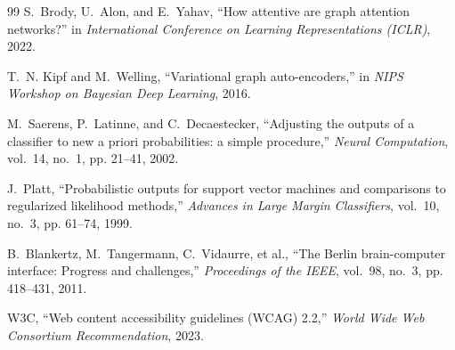 \documentclass[12pt,a4paper]{report}
\begin{document}
\begin{thebibliography}{99}
S.~Brody, U.~Alon, and E.~Yahav, ``How attentive are graph attention networks?'' in \emph{International Conference on Learning Representations (ICLR)}, 2022.

T.~N. Kipf and M.~Welling, ``Variational graph auto-encoders,'' in \emph{NIPS Workshop on Bayesian Deep Learning}, 2016.

M.~Saerens, P.~Latinne, and C.~Decaestecker, ``Adjusting the outputs of a classifier to new a priori probabilities: a simple procedure,'' \emph{Neural Computation}, vol.~14, no.~1, pp. 21--41, 2002.

J.~Platt, ``Probabilistic outputs for support vector machines and comparisons to regularized likelihood methods,'' \emph{Advances in Large Margin Classifiers}, vol.~10, no.~3, pp. 61--74, 1999.

B.~Blankertz, M.~Tangermann, C.~Vidaurre, et al., ``The Berlin brain-computer interface: Progress and challenges,'' \emph{Proceedings of the IEEE}, vol.~98, no.~3, pp. 418--431, 2011.

W3C, ``Web content accessibility guidelines (WCAG) 2.2,'' \emph{World Wide Web Consortium Recommendation}, 2023.

\end{thebibliography}
\end{document}
